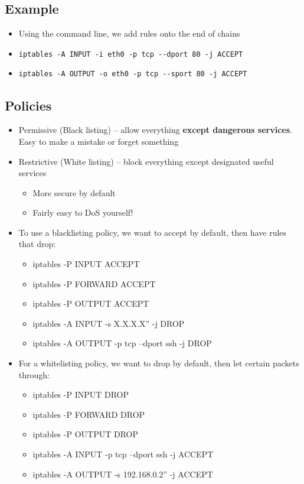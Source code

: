 \documentclass{article}
\begin{document}
\subsection{Example}
\begin{itemize}
  \item Using the command line, we add rules onto the end of chains
  \item \verb!iptables -A INPUT -i eth0 -p tcp --dport 80 -j ACCEPT!
  \item \verb!iptables -A OUTPUT -o eth0 -p tcp --sport 80 -j ACCEPT!
\end{itemize}

\pagebreak

\subsection{Policies}
\begin{itemize}
  \item Permissive (Black listing) – allow everything \textbf{except dangerous services}. Easy to make a mistake or forget something 
  \item Restrictive (White listing) – block everything except designated useful services 
  \begin{itemize}
    \item More secure by default 
    \item Fairly easy to DoS yourself!
  \end{itemize}
  \item To use a blacklisting policy, we want to accept by default, then have rules that drop:
  \begin{itemize}
    \item iptables -P INPUT ACCEPT
    \item iptables -P FORWARD ACCEPT
    \item iptables -P OUTPUT ACCEPT
    \item iptables -A INPUT -s X.X.X.X” -j DROP
    \item iptables -A OUTPUT -p tcp --dport ssh -j DROP
  \end{itemize}
  \item For a whitelisting policy, we want to drop by default, then let certain packets through:
  \begin{itemize}
    \item iptables -P INPUT DROP
    \item iptables -P FORWARD DROP
    \item iptables -P OUTPUT DROP
    \item iptables -A INPUT -p tcp --dport ssh -j ACCEPT
    \item iptables -A OUTPUT -s 192.168.0.2” -j ACCEPT
  \end{itemize}
\end{itemize}
\end{document}

